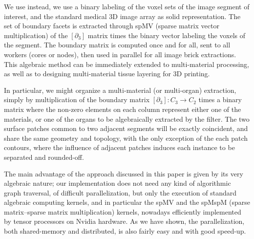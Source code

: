 We use instead, we use a binary labeling of the voxel sets of the image segment of interest, and the standard medical 3D image array as solid representation. The set of boundary facets is extracted through spMV (sparse matrix vector multiplication) of the $[\partial_3]$ matrix times the binary vector labeling the voxels of the segment. The boundary matrix is computed once and for all, sent to all workers (cores or nodes), then used in parallel for all image brick extractions. This algebraic method can be immediately extended to multi-material processing, as well as to designing multi-material tissue layering for 3D printing.

In particular, we might organize a multi-material (or multi-organ) extraction, simply by multiplication of the boundary matrix $[\partial_3]: C_3\to C_2$  times a binary matrix where the non-zero elements on each column represent either one of the materials, or one of the organs to be algebraically extracted by the filter. The two surface patches common to two adjacent segments will be exactly coincident, and share the same geometry and topology, with the only exception of the each patch contours, where the influence of adjacent patches induces each instance to be separated and rounded-off.
%

The main advantage of the approach discussed in this paper is given by its very algebraic nature; our implementation does not need any kind of algorithmic graph traversal, of difficult parallelization, but only the execution of standard algebraic computing kernels, and in particular the spMV and the spMspM (sparse matrix--sparse matrix multiplication) kernels, nowadays efficiently implemented by tensor processors on Nvidia hardware.  As we have shown, the parallelization, both shared-memory and distributed, is also fairly easy and with good speed-up.



